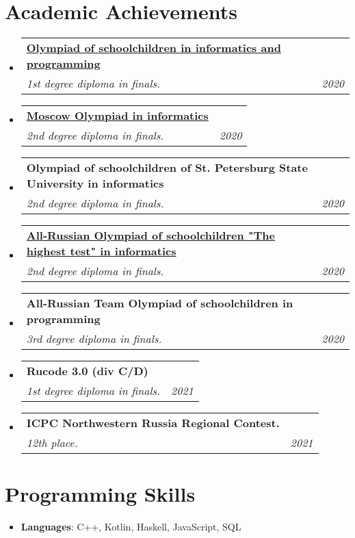 \documentclass[letterpaper,11pt]{article}
\makeatletter
\newcommand{\resumeSubheading}[4]{
  \vspace{-1pt}\item
    \begin{tabular*}{0.97\textwidth}{l@{\extracolsep{\fill}}r}
      \textbf{#1} & #2 \\
      \textit{\small#3} & \textit{\small #4} \\
    \end{tabular*}\vspace{-5pt}
}
\newcommand{\resumeSubHeadingListStart}{\begin{itemize}[leftmargin=*]}
\newcommand{\resumeSubHeadingListEnd}{\end{itemize}}
\makeatother
\begin{document}
\section{Academic Achievements}
  \resumeSubHeadingListStart
    \resumeSubheading{\href{https://neerc.ifmo.ru/school/ioip/standings-2020.html}{Olympiad of schoolchildren in informatics and programming}}{}
    {1st degree diploma in finals.}{2020}
    \resumeSubheading{\href{https://mos-inf.olimpiada.ru/winners10-11-2020}{Moscow Olympiad in informatics}}{}
    {2nd degree diploma in finals.}{2020}
    \resumeSubheading{Olympiad of schoolchildren of St. Petersburg
State University in informatics}{}
    {2nd degree diploma in finals.}{2020}
    \resumeSubheading{\href{https://olymp.hse.ru/data/2020/04/03/1556029378/\%D0\%98\%D0\%BD\%D1\%84\%D0\%BE\%D1\%80\%D0\%BC\%D0\%B0\%D1\%82\%D0\%B8\%D0\%BA\%D0\%B0\%2011.pdf}{All-Russian Olympiad of schoolchildren "The highest test" in informatics}}{}
    {2nd degree diploma in finals.}{2020}
    \resumeSubheading{All-Russian Team Olympiad of schoolchildren in programming}{}
    {3rd degree diploma in finals.}{2020}
    \resumeSubheading{Rucode 3.0 (div C/D)}{}
    {1st degree diploma in finals.}{2021}
    \resumeSubheading{ICPC Northwestern Russia Regional Contest.}{}
    {12th place.}{2021}
  \resumeSubHeadingListEnd

\section{Programming Skills}
  \resumeSubHeadingListStart
    \item{
      \textbf{Languages}{: C++, Kotlin, Haskell, JavaScript, SQL }
    }
  \resumeSubHeadingListEnd


\end{document}
